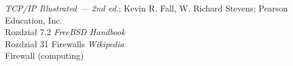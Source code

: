 \begin{thebibliography}{99}
    \emph{TCP/IP Illustrated --- 2nd ed.}; Kevin R. Fall, W. Richard Stevens; Pearson Education, Inc.\\
    Rozdział 7.2
    \emph{FreeBSD Handbook}\\
    Rozdział 31 Firewalls
    \emph{Wikipedia}\\
    Firewall (computing)
\end{thebibliography}
